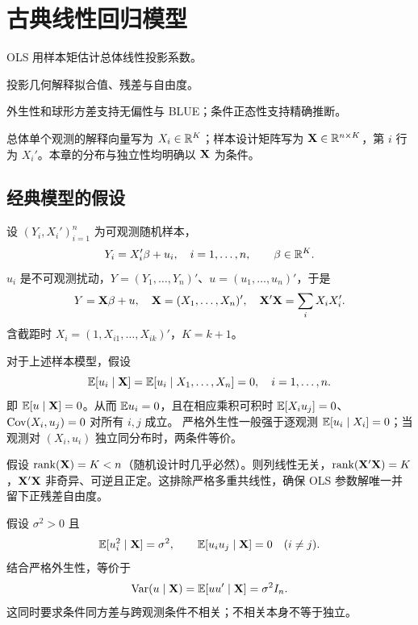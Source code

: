 \chapter{古典线性回归模型}

\begin{introduction}[本章的作用]
\item OLS 用样本矩估计总体线性投影系数。
\item 投影几何解释拟合值、残差与自由度。
\item 外生性和球形方差支持无偏性与 BLUE；条件正态性支持精确推断。
\end{introduction}
总体单个观测的解释向量写为 $X_i\in\mathbb{R}^K$；样本设计矩阵写为 $\mathbf{X}\in\mathbb{R}^{n\times K}$，第 $i$ 行为 $X_i'$。本章的分布与独立性均明确以 $\mathbf{X}$ 为条件。

\section{经典模型的假设}

\begin{proposition}[线性（假设 3.1.1）]\label{reg:entry:34}
设 $(Y_i,X_i')_{i=1}^n$ 为可观测随机样本，
\[Y_i=X_i'\beta+u_i,\quad i=1,\ldots,n,\qquad \beta\in\mathbb{R}^K.\]
$u_i$ 是不可观测扰动，$Y=(Y_1,\ldots,Y_n)'$、$u=(u_1,\ldots,u_n)'$，于是
\[Y=\mathbf{X}\beta+u,\quad \mathbf{X}=(X_1,\ldots,X_n)',\quad \mathbf{X}'\mathbf{X}=\sum_iX_iX_i'.\]
含截距时 $X_i=(1,X_{i1},\ldots,X_{ik})'$，$K=k+1$。
\end{proposition}

\begin{proposition}[严格外生性（假设 3.1.2）]\label{reg:entry:35}
对于上述样本模型，假设
\[\mathbb{E}[u_i\mid\mathbf{X}]=\mathbb{E}[u_i\mid X_1,\ldots,X_n]=0,\quad i=1,\ldots,n.\]
即 $\mathbb{E}[u\mid\mathbf{X}]=0$。从而 $\mathbb{E} u_i=0$，且在相应乘积可积时 $\mathbb{E}[X_i u_j]=0$、$\operatorname{Cov}(X_i,u_j)=0$ 对所有 $i,j$ 成立。
严格外生性一般强于逐观测 $\mathbb{E}[u_i\mid X_i]=0$；当观测对 $(X_i,u_i)$ 独立同分布时，两条件等价。
\end{proposition}

\begin{proposition}[秩条件（假设 3.1.3）]\label{reg:entry:36}
假设 $\operatorname{rank}(\mathbf{X})=K<n$（随机设计时几乎必然）。则列线性无关，$\operatorname{rank}(\mathbf{X}'\mathbf{X})=K$，$\mathbf{X}'\mathbf{X}$ 非奇异、可逆且正定。这排除严格多重共线性，确保 OLS 参数解唯一并留下正残差自由度。
\end{proposition}

\begin{proposition}[球形误差方差（假设 3.1.4）]\label{reg:entry:37}
假设 $\sigma^2>0$ 且
\[\mathbb{E}[u_i^2\mid\mathbf{X}]=\sigma^2,\qquad \mathbb{E}[u_i u_j\mid\mathbf{X}]=0\quad(i\ne j).\]
结合严格外生性，等价于
\[\operatorname{Var}(u\mid\mathbf{X})=\mathbb{E}[uu'\mid\mathbf{X}]=\sigma^2 I_n.\]
这同时要求条件同方差与跨观测条件不相关；不相关本身不等于独立。
\end{proposition}

